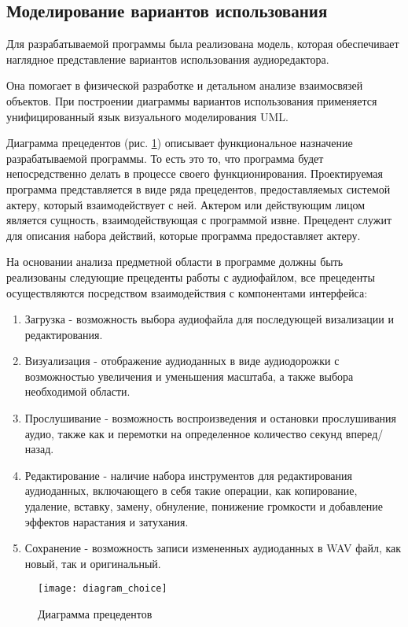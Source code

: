 \subsection{Моделирование вариантов использования}

Для разрабатываемой программы была реализована модель, которая обеспечивает наглядное представление вариантов использования аудиоредактора.

Она помогает в физической разработке и детальном анализе взаимосвязей объектов. При построении диаграммы вариантов использования применяется унифицированный язык визуального моделирования UML.

Диаграмма прецедентов (рис. \ref{diagram_choice:image}) описывает функциональное назначение разрабатываемой программы. То есть это то, что программа будет непосредственно делать в процессе своего функционирования. Проектируемая программа представляется в виде ряда прецедентов, предоставляемых системой актеру, который взаимодействует с ней. Актером или действующим лицом является сущность, взаимодействующая с программой извне. Прецедент служит для описания набора действий, которые программа предоставляет актеру. 

На основании анализа предметной области в программе должны быть реализованы следующие прецеденты работы с аудиофайлом, все прецеденты осуществляются посредством взаимодействия с компонентами интерфейса:
\begin{enumerate}
\item Загрузка - возможность выбора аудиофайла для последующей визализации и редактирования.
\item Визуализация - отображение аудиоданных в виде аудиодорожки с возможностью увеличения и уменьшения масштаба, а также выбора необходимой области.
\item Прослушивание - возможность воспроизведения и остановки прослушивания аудио, также как и перемотки на определенное количество секунд вперед/назад.
\item Редактирование - наличие набора инструментов для редактирования аудиоданных, включающего в себя такие операции, как копирование, удаление, вставку, замену, обнуление, понижение громкости и добавление эффектов нарастания и затухания.
\item Сохранение - возможность записи измененных аудиоданных в WAV файл, как новый, так и оригинальный.
\end{enumerate}

\begin{figure}[ht]
	\texttt{[image: diagram\_choice]}
	\caption{Диаграмма прецедентов}
	\label{diagram_choice:image}
\end{figure}

